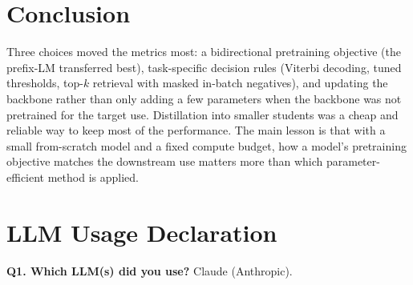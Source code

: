 \documentclass[11pt]{article}
\begin{document}
\section{Conclusion}
\label{sec:conclusion}
Three choices moved the metrics most: a bidirectional pretraining objective (the prefix-LM transferred best), task-specific decision rules (Viterbi decoding, tuned thresholds, top-$k$ retrieval with masked in-batch negatives), and updating the backbone rather than only adding a few parameters when the backbone was not pretrained for the target use. Distillation into smaller students was a cheap and reliable way to keep most of the performance. The main lesson is that with a small from-scratch model and a fixed compute budget, how a model's pretraining objective matches the downstream use matters more than which parameter-efficient method is applied.

\clearpage



\clearpage
\section*{LLM Usage Declaration}
\medskip\noindent\textbf{Q1. Which LLM(s) did you use?} Claude (Anthropic).
\end{document}
